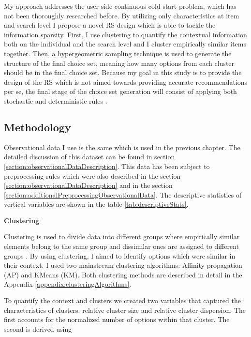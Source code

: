 \documentclass[a4paper,12pt]{article}
\begin{document}
My approach addresses the user-side continuous cold-start problem, which has not been thoroughly researched before. By utilizing only characteristics at item and search level I propose a novel RS design which is able to tackle the information sparsity. First, I use clustering \citep{rokach2005clustering} to quantify the contextual information both on the individual and the search level and I cluster empirically similar items together. Then, a hypergeometric sampling technique is used to generate the structure of the final choice set, meaning how many options from each cluster should be in the final choice set. Because my goal in this study is to provide the design of the RS which is not aimed towards providing accurate recommendations per se, the final stage of the choice set generation will consist of applying both stochastic \citep{mcfadden1973conditional, urban1984testing} and deterministic rules \citep{hauser2014consideration, lee2004effect, coombs1951mathematical}.

\subsection{Methodology}

Observational data I use is the same which is used in the previous chapter. The detailed discussion of this dataset can be found in section \ref{section:observationalDataDescription}. This data has been subject to preprocessing rules which were also described in the section \ref{section:observationalDataDescription} and in the section \ref{section:additionalPreprocessingObservationalData}. The descriptive statistics of vertical variables are shown in the table \ref{tab:descriptiveStats}.

\textbf{Clustering}

Clustering is used to divide data into different groups where empirically similar elements belong to the same group and dissimilar ones are assigned to different groups \citep{rokach2005clustering}. By using clustering, I aimed to identify options which were similar in their context. I used two mainstream clustering algorithms: Affinity propagation (AP) and KMeans (KM). Both clustering methods are described in detail in the Appendix \ref{appendix:clusteringAlgorithms}.

To quantify the context and clusters we created two variables that captured the characteristics of clusters: relative cluster size and relative cluster dispersion. The first accounts for the normalized number of options within that cluster. The second is derived using
\end{document}
